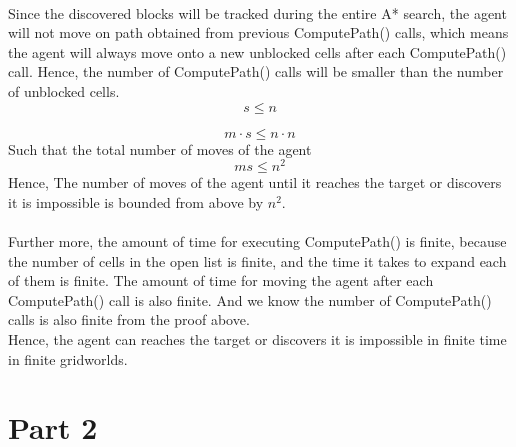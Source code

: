 \documentclass{article}
\begin{document}
\paragraph*{}
Since the discovered blocks will be tracked during the entire A* search, the agent will not move on path obtained from previous ComputePath() calls, which means the agent will always move onto a new unblocked cells after each ComputePath() call. Hence, the number of ComputePath() calls will be smaller than the number of unblocked cells.
$$s \le n$$

$$m\cdot s \le n\cdot n$$
Such that the total number of moves of the agent
$$ms\le n^2$$
Hence, The number of moves of the agent until it reaches the target or discovers it is impossible is bounded from above by $n^2$.

\paragraph*{}
Further more, the amount of time for executing ComputePath() is finite, because the number of cells in the open list is finite, and the time it takes to expand each of them is finite. The amount of time for moving the agent after each ComputePath() call is also finite. And we know the number of ComputePath() calls is also finite from the proof above. \\Hence, the agent can reaches the target or discovers it is impossible in finite time in finite gridworlds.

\section*{Part 2}
\end{document}
